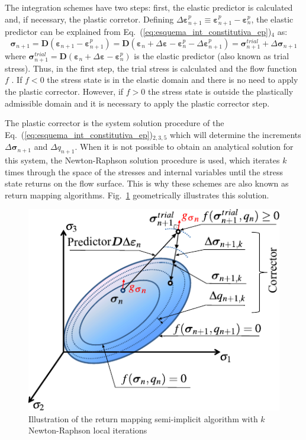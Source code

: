 \documentclass[Journal,letterpaper]{ascelike-new}
\newcommand{\Dsdee}{\boldsymbol{D}}
\newcommand{\strain}{\boldsymbol{\varepsilon}}
\newcommand{\strainp}{\boldsymbol{\varepsilon}^{p}}
\newcommand{\stress}{\boldsymbol{\sigma}}
\begin{document}
The integration schemes have two steps: first, the elastic predictor is calculated and, if necessary, the plastic corretor. Defining  $\Delta \strainp_{n+1} \equiv \strainp_{n+1} - \strainp_{n}$, the elastic predictor can be explained from Eq.~(\ref{eq:esquema_int_constitutiva_ep})$_4$ as: 
\begin{equation}
	\label{eq:preditor_elastico}
	\stress_{n+1} = \Dsdee(\strain_{n+1}-\strain_{n+1}^p) = \Dsdee(\strain_n+\Delta \strain-\strain_{n}^ p-\Delta \strain_{n+1}^p) = \stress_{n+1}^{trial} + \Delta \stress_{n+1}
\end{equation}
where $\stress_{n+1}^{trial} = \Dsdee (\strain_n+\Delta \strain-\strain_{n}^ p)$ is the elastic predictor (also known as trial stress). Thus, in the first step, the trial stress is calculated and the flow function $f$  . If  $f<0$  the stress state is in the elastic domain and there is no need to apply the plastic corrector. However, if $f>0$ the stress state is outside the plastically admissible domain and it is necessary to apply the plastic corrector step.

The plastic corrector is the system solution procedure of the Eq.~(\ref{eq:esquema_int_constitutiva_ep})$_{2,3,5}$ which will determine the increments $\Delta \stress_{n+1}$ and $\Delta q_{n+1}$. When it is not possible to obtain an analytical solution for this system, the Newton-Raphson solution procedure is used, which iterates $k$ times through the space of the stresses and internal variables until the stress state returns on the flow surface. This is why these schemes are also known as return mapping algorithms. Fig.~\ref{ep-algorithm-representation} geometrically illustrates this solution.

\begin{figure}
	\centering
	\includegraphics[scale=1]{FIG2.pdf}
	\caption{Illustration of the return mapping semi-implicit algorithm with $k$ Newton-Raphson local iterations}
	\label{ep-algorithm-representation}
\end{figure}
\end{document}
